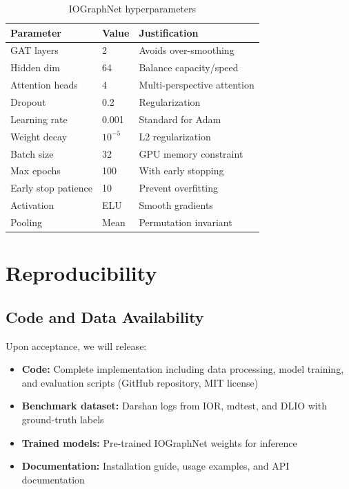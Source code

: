 \begin{table}[ht]
\caption{IOGraphNet hyperparameters}
\label{tab:model-hyperparams}
\small
\begin{tabular}{@{}lll@{}}
\toprule
Parameter & Value & Justification \\
\midrule
GAT layers & 2 & Avoids over-smoothing \\
Hidden dim & 64 & Balance capacity/speed \\
Attention heads & 4 & Multi-perspective attention \\
Dropout & 0.2 & Regularization \\
Learning rate & 0.001 & Standard for Adam \\
Weight decay & $10^{-5}$ & L2 regularization \\
Batch size & 32 & GPU memory constraint \\
Max epochs & 100 & With early stopping \\
Early stop patience & 10 & Prevent overfitting \\
Activation & ELU & Smooth gradients \\
Pooling & Mean & Permutation invariant \\
\bottomrule
\end{tabular}
\end{table}

\section{Reproducibility}
\label{app:reproducibility}

\subsection{Code and Data Availability}

Upon acceptance, we will release:
\begin{itemize}
    \item \textbf{Code:} Complete implementation including data processing, model training, and evaluation scripts (GitHub repository, MIT license)
    \item \textbf{Benchmark dataset:} Darshan logs from IOR, mdtest, and DLIO with ground-truth labels
    \item \textbf{Trained models:} Pre-trained IOGraphNet weights for inference
    \item \textbf{Documentation:} Installation guide, usage examples, and API documentation
\end{itemize}

